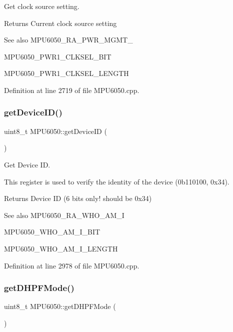 Get clock source setting. 

\begin{DoxyReturn}{Returns}
Current clock source setting 
\end{DoxyReturn}
\begin{DoxySeeAlso}{See also}
M\+P\+U6050\+\_\+\+R\+A\+\_\+\+P\+W\+R\+\_\+\+M\+G\+M\+T\+\_ 

M\+P\+U6050\+\_\+\+P\+W\+R1\+\_\+\+C\+L\+K\+S\+E\+L\+\_\+\+B\+IT 

M\+P\+U6050\+\_\+\+P\+W\+R1\+\_\+\+C\+L\+K\+S\+E\+L\+\_\+\+L\+E\+N\+G\+TH 
\end{DoxySeeAlso}


Definition at line 2719 of file M\+P\+U6050.\+cpp.

\mbox{\label{classMPU6050_a35ae3c8894b3258e642043886801e031}} 
\subsubsection{\texorpdfstring{getDeviceID()}{getDeviceID()}}
{\footnotesize\ttfamily uint8\+\_\+t M\+P\+U6050\+::get\+Device\+ID (\begin{DoxyParamCaption}{ }\end{DoxyParamCaption})}



Get Device ID. 

This register is used to verify the identity of the device (0b110100, 0x34). \begin{DoxyReturn}{Returns}
Device ID (6 bits only! should be 0x34) 
\end{DoxyReturn}
\begin{DoxySeeAlso}{See also}
M\+P\+U6050\+\_\+\+R\+A\+\_\+\+W\+H\+O\+\_\+\+A\+M\+\_\+I 

M\+P\+U6050\+\_\+\+W\+H\+O\+\_\+\+A\+M\+\_\+\+I\+\_\+\+B\+IT 

M\+P\+U6050\+\_\+\+W\+H\+O\+\_\+\+A\+M\+\_\+\+I\+\_\+\+L\+E\+N\+G\+TH 
\end{DoxySeeAlso}


Definition at line 2978 of file M\+P\+U6050.\+cpp.

\mbox{\label{classMPU6050_a4c3b84a906fcb5a65870fa557f797f4a}} 
\subsubsection{\texorpdfstring{getDHPFMode()}{getDHPFMode()}}
{\footnotesize\ttfamily uint8\+\_\+t M\+P\+U6050\+::get\+D\+H\+P\+F\+Mode (\begin{DoxyParamCaption}{ }\end{DoxyParamCaption})}



